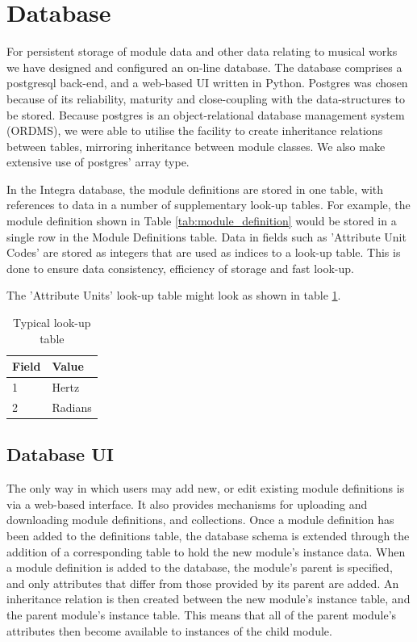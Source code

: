 \section{Database}\label{sec:database}

For persistent storage of module data and other data relating to
musical works we have designed and configured an on-line database. The
database comprises a postgresql back-end, and a web-based UI written
in Python. Postgres was chosen because of its reliability, maturity
and close-coupling with the data-structures to be stored. Because
postgres is an object-relational database management system (ORDMS),
we were able to utilise the facility to create inheritance relations
between tables, mirroring inheritance between module classes. We also
make extensive use of postgres' array type.

In the Integra database, the module definitions are stored in one
table, with references to data in a number of supplementary look-up
tables. For example, the module definition shown in Table
\ref{tab:module_definition} would be stored in a single row in the
Module Definitions table. Data in fields such as 'Attribute Unit
Codes' are stored as integers that are used as indices to a look-up
table. This is done to ensure data consistency, efficiency of storage
and fast look-up.

The 'Attribute Units' look-up table might look as shown in table \ref{tab:lookup_table}.

\begin{table} 
\begin{center}
\begin{tabular}{|l|l|}
\hline
\textbf{Field} \T \B & \textbf{Value} \\
\hline
1 & Hertz \T \\
\hline
2 & Radians \T \\
\hline
\end{tabular} 
\end{center}
\caption{Typical look-up table}
\label{tab:lookup_table}
\end{table}

\subsection{Database UI}\label{subsec:db_ui}
The only way in which users may add new, or edit existing module
definitions is via a web-based interface. It also provides mechanisms
for uploading and downloading module definitions, and collections.
Once a module definition has been added to the definitions table, the
database schema is extended through the addition of a corresponding
table to hold the new module's instance data. When a module definition
is added to the database, the module's parent is specified, and only
attributes that differ from those provided by its parent are added. An
inheritance relation is then created between the new module's instance
table, and the parent module's instance table. This means that all of
the parent module's attributes then become available to instances of
the child module.


